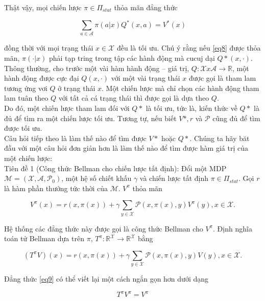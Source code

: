 \documentclass[14pt,a4paper,oneside]{report}		%
\begin{document}
Thật vậy, mọi chiến lược $\pi\in\Pi_{stat}$ thỏa mãn đẳng thức

\begin{equation} \label{eq8}
\sum_{a\in\mathcal{A}}{\pi (a|x)Q^*(x,a)} = V^*(x)
\end{equation}

đồng thời với mọi trạng thái $x \in \mathcal{X}$ đều là tối ưu. Chú ý rằng nếu \ref{eq8} được thỏa mãn, $\pi(\cdotp|x)$ phải tạp tring trong tập các hành động mà cucuj dại $Q*(x,\cdotp)$. Thông thường, cho trước một vài hàm hành động – giá trị, $Q:\mathcal{X}x\mathcal{A}\rightarrow\mathbb{R}$, một hành động được cực đại $Q(x,\cdotp)$ với một vài trạng thái $x$ được gọi là tham lam tương ứng vơi $Q$ ở trạng thái $x$. Một chiến lược mà chỉ chọn các hành động tham lam tuân theo $Q$ với tất cả cá trạng thái thì được gọi là dựa theo $Q$. \\
Do đó, một chiến lược tham lam đối với $Q*$ là tối ưu, tức là, kiến thức về $Q*$ là đủ để tìm ra một chiến lược tối ưu. Tương tự, nếu biết $V* ,r$ và $\mathcal{P}$ cũng đủ để tìm được tối ưu. \\
Câu hỏi tiếp theo là làm thế nào để tìm được $V*$ hoặc $Q*$. Chúng ta hãy băt đầu với một câu hỏi đơn giản hơn là làm thế nào để tìm được hàm giá trị của một chiến lược: \\
Tiên đề 1 (Công thức Bellman cho chiến lược tất định): Đổi một MDP $\mathcal{M} = (\mathcal{X},\mathcal{A},\mathcal{P}_0)$, một hệ số chiết khấu $\gamma$ và chiến lược tất định $\pi \in \Pi_{stat}$. Gọi $r$ là hàm phần thưởng tức thời của $\mathcal{M}$. $V^\pi$ thỏa mãn

\begin{equation} \label{eq9}
V^\pi(x) = r(x,\pi(x)) + \gamma \displaystyle\sum_{y\in\mathcal{X}}{\mathcal{P}(x,\pi(x),y)V^\pi(y)}, x\in\mathcal{X}.
\end{equation}

Hệ thống các đẳng thức này được gọi là công thức Bellman cho $V^\pi$. Định nghĩa toán tử Bellman dựa trên $\pi$, $T^\pi : \mathbb{R}^{\mathcal{X}}\rightarrow\mathbb{R}^{\mathcal{X}}$ bằng

$$(T^\pi V)(x) = r(x,\pi(x)) + \gamma \displaystyle\sum_{y\in\mathcal{X}}{\mathcal{P}(x,\pi(x),y)V(y)}, x\in\mathcal{X}.$$

Đẳng thức \ref{eq9} có thể viết lại một cách ngắn gọn hơn dưới dạng

\begin{equation} \label{eq10}
T^\pi V^\pi =V^\pi
\end{equation}
\end{document}
